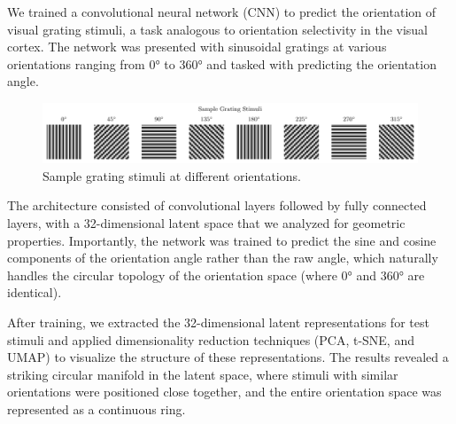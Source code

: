 \documentclass[11pt,a4paper]{article}
\begin{document}
We trained a convolutional neural network (CNN) to predict the orientation of visual grating stimuli, a task analogous to orientation selectivity in the visual cortex. The network was presented with sinusoidal gratings at various orientations ranging from 0° to 360° and tasked with predicting the orientation angle.

\begin{figure}
    \centering
    \includegraphics[width=\linewidth]{results/grating_samples.pdf}
    \caption{Sample grating stimuli at different orientations.}
    \label{fig:grating_samples}
\end{figure}

The architecture consisted of convolutional layers followed by fully connected layers, with a 32-dimensional latent space that we analyzed for geometric properties. Importantly, the network was trained to predict the sine and cosine components of the orientation angle rather than the raw angle, which naturally handles the circular topology of the orientation space (where 0° and 360° are identical).

After training, we extracted the 32-dimensional latent representations for test stimuli and applied dimensionality reduction techniques (PCA, t-SNE, and UMAP) to visualize the structure of these representations. The results revealed a striking circular manifold in the latent space, where stimuli with similar orientations were positioned close together, and the entire orientation space was represented as a continuous ring.
\end{document}

